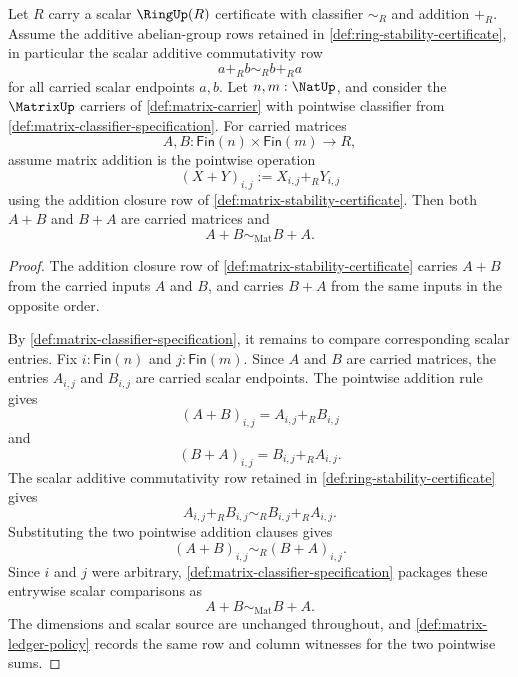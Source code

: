 \begin{theorem}
\label{thm:matrix-addition-commutativity-from-scalar-additive-commutativity}
Let $R$ carry a scalar $\RingUp(R)$ certificate with classifier $\sim_R$ and addition $+_R$. Assume the additive abelian-group rows retained in \autoref{def:ring-stability-certificate}, in particular the scalar additive commutativity row
$$
a+_R b\sim_R b+_R a
$$
for all carried scalar endpoints $a,b$. Let $n,m:\NatUp$, and consider the $\MatrixUp$ carriers of \autoref{def:matrix-carrier} with pointwise classifier from \autoref{def:matrix-classifier-specification}. For carried matrices
$$
A,B:\mathsf{Fin}(n)\times\mathsf{Fin}(m)\to R,
$$
assume matrix addition is the pointwise operation
$$
(X+Y)_{i,j}:=X_{i,j}+_R Y_{i,j}
$$
using the addition closure row of \autoref{def:matrix-stability-certificate}. Then both $A+B$ and $B+A$ are carried matrices and
$$
A+B\sim_{\mathrm{Mat}}B+A.
$$
\end{theorem}
\begin{proof}
The addition closure row of \autoref{def:matrix-stability-certificate} carries $A+B$ from the carried inputs $A$ and $B$, and carries $B+A$ from the same inputs in the opposite order.

By \autoref{def:matrix-classifier-specification}, it remains to compare corresponding scalar entries. Fix $i:\mathsf{Fin}(n)$ and $j:\mathsf{Fin}(m)$. Since $A$ and $B$ are carried matrices, the entries $A_{i,j}$ and $B_{i,j}$ are carried scalar endpoints. The pointwise addition rule gives
$$
(A+B)_{i,j}=A_{i,j}+_R B_{i,j}
$$
and
$$
(B+A)_{i,j}=B_{i,j}+_R A_{i,j}.
$$
The scalar additive commutativity row retained in \autoref{def:ring-stability-certificate} gives
$$
A_{i,j}+_R B_{i,j}\sim_R B_{i,j}+_R A_{i,j}.
$$
Substituting the two pointwise addition clauses gives
$$
(A+B)_{i,j}\sim_R(B+A)_{i,j}.
$$
Since $i$ and $j$ were arbitrary, \autoref{def:matrix-classifier-specification} packages these entrywise scalar comparisons as
$$
A+B\sim_{\mathrm{Mat}}B+A.
$$
The dimensions and scalar source are unchanged throughout, and \autoref{def:matrix-ledger-policy} records the same row and column witnesses for the two pointwise sums.
\end{proof}

